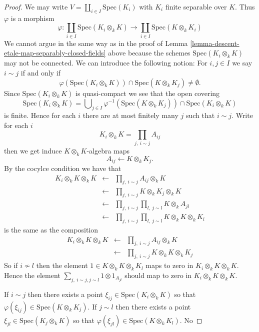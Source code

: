 \begin{proof}
We may write $V = \coprod_{i \in I} \text{Spec}(K_i)$ with $K_i$
finite separable over $K$.
Thus $\varphi$ is a morphism
$$
\varphi : 
\coprod_{i \in I} \text{Spec}(K_i \otimes_k K)
\longrightarrow
\coprod_{i \in I} \text{Spec}(K \otimes_k K_i)
$$
We cannot argue in the same way as in the proof of
Lemma \ref{lemma-descent-etale-map-separably-closed-fields}
above because the schemes $\text{Spec}(K_i \otimes_k K)$
may not be connected. We can introduce the following
notion: For $i, j \in I$ we say $i \sim j$ if and only
if
$$
\varphi(\text{Spec}(K_i \otimes_k K)) \cap
\text{Spec}(K \otimes_k K_j) \not = \emptyset.
$$
Since $\text{Spec}(K_i \otimes_k K)$ is quasi-compact we see
that the open covering
$$
\text{Spec}(K_i \otimes_k K)
=
\bigcup\nolimits_{j \in I}
\varphi^{-1}(\text{Spec}(K \otimes_k K_j)) \cap \text{Spec}(K_i \otimes_k K)
$$
is finite. Hence for each $i$ there are at most finitely many $j$ such
that $i \sim j$. Write for each $i$
$$
K_i \otimes_k K = \prod_{j,\ i \sim j} A_{ij}
$$
then we get induce $K\otimes_k K$-algebra maps
$$
A_{ij} \longleftarrow K \otimes_k K_j.
$$
By the cocylce condition we have that
\begin{eqnarray*}
K_i \otimes_k K \otimes_k K & \leftarrow &
\prod_{j,\ i \sim j} A_{ij} \otimes_k K \\
& \leftarrow & \prod_{j,\ i \sim j} K \otimes_k K_j \otimes_k K \\
& \leftarrow & \prod_{j,\ i \sim j} \prod_{l,\ j \sim l} K \otimes_k A_{jl} \\
& \leftarrow & \prod_{j,\ i \sim j} \prod_{l,\ j \sim l} K \otimes_k K \otimes_k K_l
\end{eqnarray*}
is the same as the composition
\begin{eqnarray*}
K_i \otimes_k K \otimes_k K & \leftarrow &
\prod_{j,\ i \sim j} A_{ij} \otimes_k K \\
& \leftarrow & \prod_{j,\ i \sim j} K \otimes_k K \otimes_k K_j
\end{eqnarray*}
So if $i \not \sim l$ then the element $1 \in K \otimes_k K \otimes_k K_l$
maps to zero in $K_i \otimes_k K \otimes_k K$. Hence the element
$\sum_{j,\ i \sim j, j \sim l} 1 \otimes 1_{A_{jl}}$ should map to
zero in $K_i \otimes_k K \otimes_k K$.




\medskip\noindent
If $i \sim j$ then there exists a point
$\xi_{ij} \in \text{Spec}(K_i \otimes_k K)$
so that $\varphi(\xi_{ij}) \in \text{Spec}(K \otimes_k K_j)$.
If $j \sim l$ then there exists a point
$\xi_{jl} \in \text{Spec}(K_j \otimes_k K)$
so that $\varphi(\xi_{jl}) \in \text{Spec}(K \otimes_k K_l)$.
No





\end{proof}
